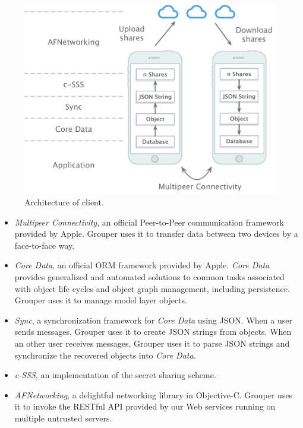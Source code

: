 \documentclass[twocolumn,10pt]{article}
\begin{document}
\begin{figure}[t]
	\centering
	\includegraphics[scale=0.36]{architecture}
	\caption{Architecture of client.}
\end{figure}

\begin{itemize}
	\setlength{\itemsep}{1pt}
	\setlength{\parskip}{0pt}
	\setlength{\parsep}{0pt}
	\item 
	\emph{Multipeer Connectivity}\cite{mc},  an official Peer-to-Peer communication framework provided by Apple. 
	Grouper uses it to transfer data between two devices by a face-to-face way.
	\item 
	\emph{Core Data}\cite{coredata}, an official ORM framework provided by Apple.
	\emph{Core Data} provides generalized and automated solutions to common tasks associated with object life cycles and object graph management, including persistence. 
	Grouper uses it to manage model layer objects. 
	\item 
	\emph{Sync}\cite{sync}, a synchronization framework for \emph{Core Data} using JSON. 
	When a user sends messages, Grouper uses it to create JSON strings from objects. 
	When an other user receives messages, Grouper uses it to parse JSON strings and synchronize the recovered objects into \emph{Core Data}.
	\item 
	\emph{c-SSS}\cite{c-sss}, an implementation of the secret sharing scheme.
	\item 
	\emph{AFNetworking}\cite{afnetworking}, a delightful networking library in Objective-C. 
	Grouper uses it to invoke the RESTful API provided by our Web services running on multiple untrusted servers. 
\end{itemize}
\end{document}
